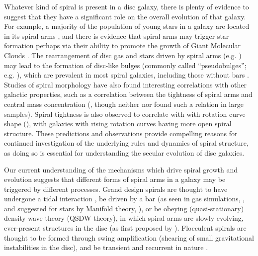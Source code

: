 Whatever kind of spiral is present in a disc galaxy, there is plenty of evidence to suggest that they have a significant role on the overall evolution of that galaxy. For example, a majority of the population of young stars in a galaxy are located in its spiral arms \citep{2011EAS....51...19E}, and there is evidence that spiral arms may trigger star formation \citep{2013A&A...560A..59C} perhaps via their ability to promote the growth of Giant Molecular Clouds \citep{2014IAUS..298..221D}. The rearrangement of disc gas and stars driven by spiral arms (e.g. \citealt{2018MNRAS.476.1561D}) may lead to the formation of disc-like bulges (commonly called ``pseudobulges''; e.g. \citealt{2004ARA&A..42..603K}), which are prevalent in most spiral galaxies, including those without bars \citep{2010ApJ...716..942F}. Studies of spiral morphology have also found interesting correlations with other galactic properties, such as a correlation between the tightness of spiral arms and central mass concentration (\citealt{2019ApJ...871..194Y}, though neither \citealt{2017MNRAS.472.2263H} nor \citealt{2019MNRAS.487.1808M} found such a relation in large samples). Spiral tightness is also observed to correlate with with rotation curve shape (\citealt{2005MNRAS.359.1065S}), with galaxies with rising rotation curves having more open spiral structure. These predictions and observations provide compelling reasons for continued investigation of the underlying rules and dynamics of spiral structure, as doing so is essential for understanding the secular evolution of disc galaxies.

Our current understanding of the mechanisms which drive spiral growth and evolution suggests that different forms of spiral arms in a galaxy may be triggered by different processes. Grand design spirals are thought to have undergone a tidal interaction \citep{2010MNRAS.403..625D,2017ApJ...834....7S}, be driven by a bar (as seen in gas simulations, \citealt{1976ApJ...209...53S,2008A&A...489..115R}, and suggested for stars by Manifold theory, \citealt{2006A&A...453...39R,2009MNRAS.394...67A,2009MNRAS.400.1706A}), or be obeying (quasi-stationary) density wave theory (QSDW theory), in which spiral arms are slowly evolving, ever-present structures in the disc (as first proposed by \citealt{1964ApJ...140..646L}). Flocculent spirals are thought to be formed through swing amplification (shearing of small gravitational instabilities in the disc), and be transient and recurrent in nature \citep{1966ApJ...146..810J}.

